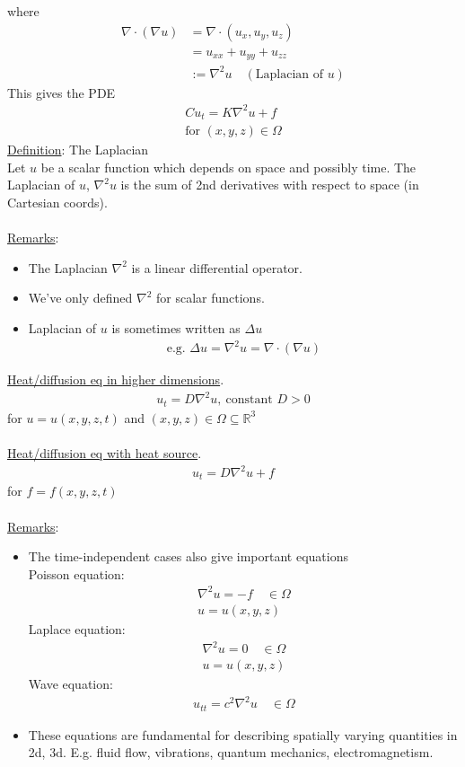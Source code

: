 \documentclass[12pt, letterpaper]{article}
\begin{document}
where
\begin{align*}
    \nabla \cdot (\nabla u) &= \nabla \cdot (u_x,u_y,u_z) \\
    &= u_{xx} + u_{yy} + u_{zz} \\
    &:= \nabla ^2 u \quad (\text{Laplacian of }u)
\end{align*}
This gives the PDE 
\begin{align*}
    Cu_t = K \nabla^2u + f \\
    \text{for } (x,y,z) \in \Omega
\end{align*}
\underline{Definition}: The Laplacian \\
Let $u$ be a scalar function which depends on space and possibly time. The Laplacian 
of $u$, $\nabla^2u$ is the sum of 2nd derivatives with respect to space (in Cartesian
coords). \\ \\
\underline{Remarks}:
\begin{itemize}
    \item The Laplacian $\nabla^2$ is a linear differential operator.
    \item We've only defined $\nabla^2$ for scalar functions.
    \item Laplacian of $u$ is sometimes written as $\Delta u$
    \begin{align*}
        \text{e.g. } \Delta u = \nabla^2 u = \nabla\cdot(\nabla u)
    \end{align*}
\end{itemize}
\underline{Heat/diffusion eq in higher dimensions}.
\begin{align*}
    u_t = D \nabla^2 u,\ \text{constant } D > 0
\end{align*}
for $u = u(x,y,z,t)$ and $(x,y,z) \in \Omega \subseteq \mathbb{R}^3$  \\ \\
\underline{Heat/diffusion eq with heat source}.
\begin{align*}
    u_t = D \nabla^2 u + f
\end{align*}
for $f = f(x,y,z,t)$ \\ \\
\underline{Remarks}:
\begin{itemize}
    \item The time-independent cases also give important equations \\
    Poisson equation:
    \begin{align*}
        \nabla^2 u = - f\quad \in \Omega \\
        u = u(x,y,z)
    \end{align*}
    Laplace equation:
    \begin{align*}
        \nabla^2 u = 0\quad \in \Omega \\
        u = u(x,y,z)
    \end{align*}
    Wave equation:
    \begin{align*}
        u_{tt} = c^2 \nabla^2 u \quad \in \Omega
    \end{align*}
    \item These equations are fundamental for describing spatially varying quantities 
    in 2d, 3d. E.g. fluid flow, vibrations, quantum mechanics, electromagnetism.
\end{itemize}
\end{document}

